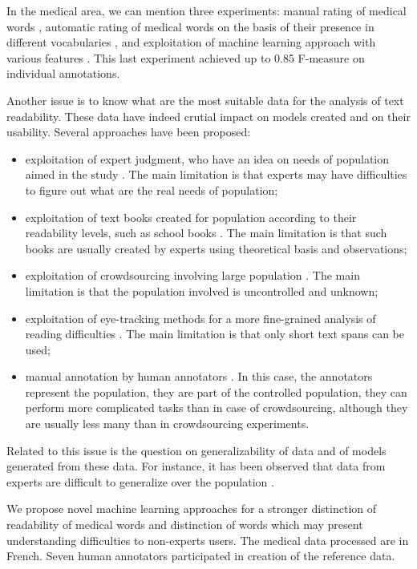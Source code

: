 In the medical area, we can mention three experiments: manual rating
of medical words \citep{Zheng-AMIA2002}, automatic rating of medical
words on the basis of their presence in different vocabularies
\citep{Borst-MIE2008}, and exploitation of machine learning approach
with various features \citep{Grabar-PITR2014}. This last experiment
achieved up to 0.85 F-measure on individual annotations.

Another issue is to know what are the most suitable data for the
analysis of text readability. These data have indeed crutial impact on
models created and on their usability.  Several approaches have been
proposed:
\begin{itemize}
\item exploitation of expert judgment, who have an idea on needs of
  population aimed in the study \citep{DeClerc-NLE2014}. The main
  limitation is that experts may have difficulties to figure out what
  are the real needs of population;
\item exploitation of text books created for population according to
  their readability levels, such as school books
  \citep{Gala-ELEX2013}. The main limitation is that such books are
  usually created by experts using theoretical basis and observations;
\item exploitation of crowdsourcing involving large population
  \citep{DeClerc-NLE2014}.  The main limitation is that the
  population involved is uncontrolled and unknown;
\item exploitation of eye-tracking methods for a more fine-grained
  analysis of reading difficulties
  \citep{Yaneva-CCA2015,Grabar-ICHI2018}.  The main limitation is that
  only short text spans can be used;
\item manual annotation by human annotators
  \citep{Grabar-LREC2016t}. In this case, the annotators represent the
  population, they are part of the controlled population, they can
  perform more complicated tasks than in case of crowdsourcing,
  although they are usually less many than in crowdsourcing
  experiments.
\end{itemize}
Related to this issue is the question on generalizability of data and
of models generated from these data.  For instance, it has been
observed that data from experts are difficult to generalize over the
population \citep{DeClerc-NLE2014}.

We propose novel machine learning approaches for a stronger distinction of readability of medical words and distinction of words which may present understanding difficulties to non-experts users. The medical data processed are in French. Seven human annotators participated in creation of the reference data.